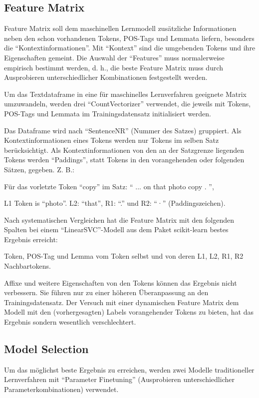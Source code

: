 \documentclass[paper=A4, ngerman, fontsize=12pt]{article}
\begin{document}
	\subsection{Feature Matrix}
	\noindent
	Feature Matrix soll dem maschinellen Lernmodell zusätzliche Informationen neben den schon vorhandenen Tokens, POS-Tags und Lemmata liefern, besonders die \enquote{Kontextinformationen}. Mit \enquote{Kontext} sind die umgebenden Tokens und ihre Eigenschaften gemeint. Die Auswahl der \enquote{Features} muss normalerweise empirisch bestimmt werden, d. h., die beste Feature Matrix muss durch Ausprobieren unterschiedlicher Kombinationen festgestellt werden. 
	
	\indent
	Um das Textdataframe in eine für maschinelles Lernverfahren geeignete Matrix umzuwandeln, werden drei \enquote{CountVectorizer} verwendet, die jeweils mit Tokens, POS-Tags und Lemmata im Trainingsdatensatz initialisiert werden. 
	
	\indent
	Das Dataframe wird nach \enquote{SentenceNR} (Nummer des Satzes) gruppiert. Als Kontextinformationen eines Tokens werden nur Tokens im selben Satz berücksichtigt. Als Kontextinformationen von den an der Satzgrenze liegenden Tokens werden \enquote{Paddings}, statt Tokens in den vorangehenden oder folgenden Sätzen, gegeben. Z. B.:
	
	\indent
	Für das vorletzte Token \enquote{copy} im Satz: \enquote{ ... on that photo copy . },
	
	\indent
	L1 Token is \enquote{photo}. L2: \enquote{that}, R1: \enquote{.} und R2: \enquote{·} (Paddingszeichen).
	
	\indent
	Nach systematischen Vergleichen hat die Feature Matrix mit den folgenden Spalten bei einem \enquote{LinearSVC}-Modell aus dem Paket scikit-learn bestes Ergebnis erreicht:
	
	\indent
	Token, POS-Tag und Lemma vom Token selbst und von deren L1, L2, R1, R2 Nachbartokens. 
	
	\indent
	Affixe und weitere Eigenschaften von den Tokens können das Ergebnis nicht verbessern. Sie führen nur zu einer höheren Überanpassung an den Trainingsdatensatz. Der Versuch mit einer dynamischen Feature Matrix dem Modell mit den (vorhergesagten) Labels vorangehender Tokens zu bieten, hat das Ergebnis sondern wesentlich verschlechtert. 
	
	\subsection{Model Selection}
	\noindent
	Um das möglichst beste Ergebnis zu erreichen, werden zwei Modelle traditioneller Lernverfahren mit \enquote{Parameter Finetuning} (Ausprobieren unterschiedlicher Parameterkombinationen) verwendet. 
	
\end{document}
